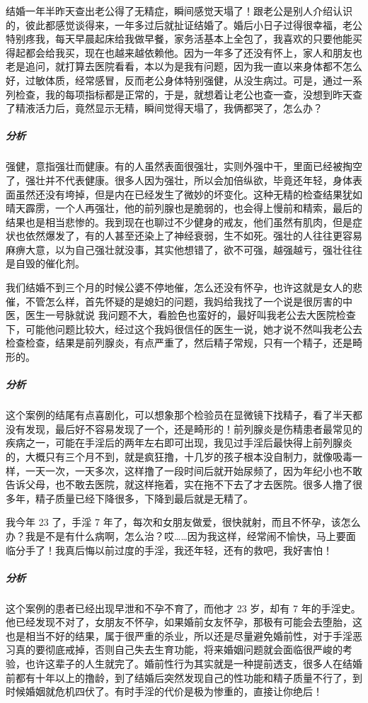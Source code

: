 \begin{case}[不孕不育]
    结婚一年半昨天查出老公得了无精症，瞬间感觉天塌了！跟老公是别人介绍认识的，彼此都感觉谈得来，一年多过后就扯证结婚了。婚后小日子过得很幸福，老公特别疼我，每天早晨起床给我做早餐，家务活基本上全包了，我喜欢的只要他能买得起都会给我买，现在也越来越依赖他。因为一年多了还没有怀上，家人和朋友也老是追问，就打算去医院看看，本以为是我有问题，因为我一直以来身体都不怎么好，过敏体质，经常感冒，反而老公身体特别强健，从没生病过。可是，通过一系列检查，我的每项指标都是正常的，于是，就想着让老公也查一查，没想到昨天查了精液活力后，竟然显示无精，瞬间觉得天塌了，我俩都哭了，怎么办？
    \subparagraph{分析} 强健，意指强壮而健康。有的人虽然表面很强壮，实则外强中干，里面已经被掏空了，强壮并不代表健康。很多人因为强壮，所以会加倍纵欲，毕竟还年轻，身体表面虽然还没有垮掉，但是内在已经发生了微妙的坏变化。这种无精的检查结果犹如晴天霹雳，一个人再强壮，他的前列腺也是脆弱的，也会得上慢前和精索，最后的结果也是相当悲惨的。我到现在也聊过不少健身的戒友，他们虽然有肌肉，但是症状也依然爆发了，有的人甚至还染上了神经衰弱，生不如死。强壮的人往往更容易麻痹大意，以为自己强壮就没事，其实他想错了，欲不可强，越强越亏，强壮往往是自毁的催化剂。
\end{case}

\begin{case}[不孕不育]
    我们结婚不到三个月的时候公婆不停地催，怎么还没有怀孕，也许这就是女人的悲催，不管怎么样，首先怀疑的是媳妇的问题，我妈给我找了一个说是很厉害的中医，医生一号脉就说 我问题不大，看脸色也蛮好的，最好叫我老公去大医院检查下，可能他问题比较大，经过这个我妈很信任的医生一说，她才说不然叫我老公去检查检查，结果是前列腺炎，有点严重了，然后精子常规，只有一个精子，还是畸形的。
    \subparagraph{分析} 这个案例的结尾有点喜剧化，可以想象那个检验员在显微镜下找精子，看了半天都没有发现，最后好不容易发现了一个，还是畸形的！前列腺炎是伤精患者最常见的疾病之一，可能在手淫后的两年左右即可出现，我见过手淫后最快得上前列腺炎的，大概只有三个月不到，就是疯狂撸，十几岁的孩子根本没自制力，就像吸毒一样，一天一次，一天多次，这样撸了一段时间后就开始尿频了，因为年纪小也不敢告诉父母，也不敢去医院，就这样拖着，实在拖不下去了才去医院。很多人撸了很多年，精子质量已经下降很多，下降到最后就是无精了。
\end{case}

\begin{case}[不孕不育]
    我今年 23 了，手淫 7 年了，每次和女朋友做爱，很快就射，而且不怀孕，该怎么办？我是不是有什么病啊，怎么治？哎……因为我这样，经常闹不愉快，马上要面临分手了！我真后悔以前过度的手淫，我还年轻，还有的救吧，我好害怕！
    \subparagraph{分析} 这个案例的患者已经出现早泄和不孕不育了，而他才 23 岁，却有 7 年的手淫史。他已经发现不对了，女朋友不怀孕，如果婚前女友怀孕，那极有可能会去堕胎，这也是相当不好的结果，属于很严重的杀业，所以还是尽量避免婚前性，对于手淫恶习真的要彻底戒掉，否则自己失去生育功能，将来婚姻问题就会面临很严峻的考验，也许这辈子的人生就完了。婚前性行为其实就是一种提前透支，很多人在结婚前都有十年以上的撸龄，到了结婚后突然发现自己的性功能和精子质量不行了，到时候婚姻就危机四伏了。有时手淫的代价是极为惨重的，直接让你绝后！
\end{case}

